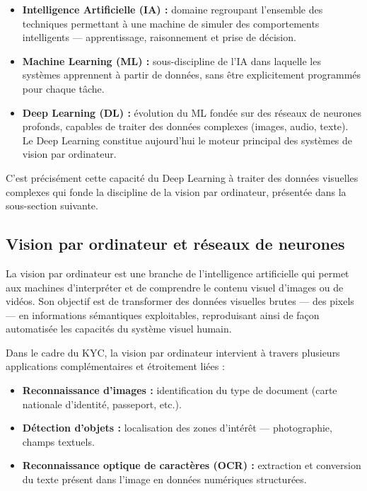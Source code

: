 \begin{itemize}
  \item \textbf{Intelligence Artificielle (IA) :} domaine regroupant l'ensemble des techniques permettant à une machine de simuler des comportements intelligents --- apprentissage, raisonnement et prise de décision.

  \item \textbf{Machine Learning (ML) :} sous-discipline de l'IA dans laquelle les systèmes apprennent à partir de données, sans être explicitement programmés pour chaque tâche.

  \item \textbf{Deep Learning (DL) :} évolution du ML fondée sur des réseaux de neurones profonds, capables de traiter des données complexes (images, audio, texte). Le Deep Learning constitue aujourd'hui le moteur principal des systèmes de vision par ordinateur.
\end{itemize}

C'est précisément cette capacité du Deep Learning à traiter des données visuelles complexes qui fonde la discipline de la vision par ordinateur, présentée dans la sous-section suivante.

\subsection{Vision par ordinateur et réseaux de neurones}
\label{subsec:vision-ordinateur}

La vision par ordinateur est une branche de l'intelligence artificielle qui permet aux machines d'interpréter et de comprendre le contenu visuel d'images ou de vidéos. Son objectif est de transformer des données visuelles brutes --- des pixels --- en informations sémantiques exploitables, reproduisant ainsi de façon automatisée les capacités du système visuel humain.

Dans le cadre du KYC, la vision par ordinateur intervient à travers plusieurs applications complémentaires et étroitement liées :

\begin{itemize}
  \item \textbf{Reconnaissance d'images :} identification du type de document (carte nationale d'identité, passeport, etc.).

  \item \textbf{Détection d'objets :} localisation des zones d'intérêt --- photographie, champs textuels.

  \item \textbf{Reconnaissance optique de caractères (OCR) :} extraction et conversion du texte présent dans l'image en données numériques structurées.
\end{itemize}

